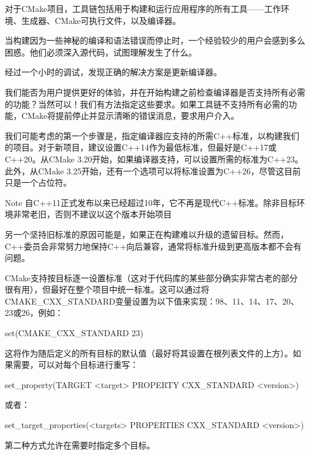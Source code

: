 对于CMake项目，工具链包括用于构建和运行应用程序的所有工具——工作环境、生成器、CMake可执行文件，以及编译器。

当构建因为一些神秘的编译和语法错误而停止时，一个经验较少的用户会感到多么困惑。他们必须深入源代码，试图理解发生了什么。

经过一个小时的调试，发现正确的解决方案是更新编译器。

我们能否为用户提供更好的体验，并在开始构建之前检查编译器是否支持所有必需的功能？当然可以！我们有方法指定这些要求。如果工具链不支持所有必需的功能，CMake将提前停止并显示清晰的错误消息，要求用户介入。


我们可能考虑的第一个步骤是，指定编译器应支持的所需C++标准，以构建我们的项目。对于新项目，建议设置C++14作为最低标准，但最好是C++17或C++20。从CMake 3.20开始，如果编译器支持，可以设置所需的标准为C++23。此外，从CMake 3.25开始，还有一个选项可以将标准设置为C++26，尽管这目前只是一个占位符。

\begin{myNotic}{Note}
自C++11正式发布以来已经超过10年，它不再是现代C++标准。除非目标环境非常老旧，否则不建议以这个版本开始项目
\end{myNotic}

另一个坚持旧标准的原因可能是，如果正在构建难以升级的遗留目标。然而，C++委员会非常努力地保持C++向后兼容，通常将标准升级到更高版本都不会有问题。

CMake支持按目标逐一设置标准（这对于代码库的某些部分确实非常古老的部分很有用），但最好在整个项目中统一标准。这可以通过将CMAKE\_CXX\_STANDARD变量设置为以下值来实现：98、11、14、17、20、23或26，例如：

\begin{cmake}
set(CMAKE_CXX_STANDARD 23)
\end{cmake}

这将作为随后定义的所有目标的默认值（最好将其设置在根列表文件的上方）。如果需要，可以对每个目标进行重写：

\begin{shell}
set_property(TARGET <target> PROPERTY CXX_STANDARD <version>)
\end{shell}

或者：

\begin{shell}
set_target_properties(<targets> PROPERTIES CXX_STANDARD <version>)
\end{shell}

第二种方式允许在需要时指定多个目标。

